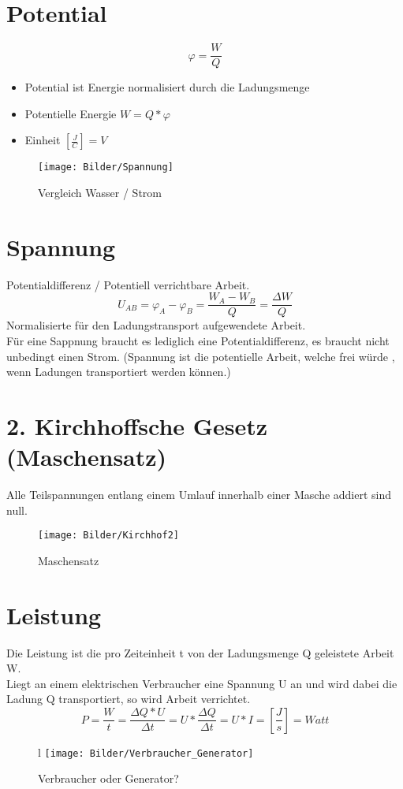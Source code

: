 \documentclass{article}
\begin{document}
	\section{Potential}
	\begin{equation}
		\varphi = \frac{W}{Q}
	\end{equation}
	\begin{itemize}
		\item Potential ist Energie normalisiert durch die Ladungsmenge
		\item Potentielle Energie $W = Q * \varphi$
		\item Einheit $[\frac{J}{C}] = V$
	\end{itemize}
	\begin{figure}[htbp]
	\centering
	\texttt{[image: Bilder/Spannung]}
	\caption{Vergleich Wasser / Strom}
	\end{figure}
	\section{Spannung}
	Potentialdifferenz / Potentiell verrichtbare Arbeit. \\
	\begin{equation}
	U_{AB} = \varphi_{A} - \varphi_{B} = \frac{W_{A} - W_{B}}{Q} = \frac{\Delta W}{Q}
	\end{equation}
	Normalisierte für den Ladungstransport aufgewendete Arbeit.\\
	Für eine Sappnung braucht es lediglich eine Potentialdifferenz, es braucht nicht unbedingt einen Strom. (Spannung ist die potentielle Arbeit, welche frei würde , wenn Ladungen transportiert werden können.)
	\section{2. Kirchhoffsche Gesetz (Maschensatz)}
	Alle Teilspannungen entlang einem Umlauf innerhalb einer Masche addiert sind null.
		\begin{figure}[htbp]
		\centering
		\texttt{[image: Bilder/Kirchhof2]}
		\caption{Maschensatz}
	\end{figure}
	\section{Leistung}
	Die Leistung ist die pro Zeiteinheit t von der Ladungsmenge Q geleistete Arbeit W. \\
	Liegt an einem elektrischen Verbraucher eine Spannung U an und wird dabei die Ladung Q transportiert, so wird Arbeit verrichtet.
	\begin{equation}
		P = \frac{W}{t} = \frac{\Delta Q * U}{\Delta t} = U * \frac{\Delta Q}{\Delta t} = U * I = [\frac{J}{s}] = Watt 
	\end{equation}
		\begin{figure}[htbp]l
		\centering
		\texttt{[image: Bilder/Verbraucher\_Generator]}
		\caption{Verbraucher oder Generator?}
	\end{figure}
\end{document}
